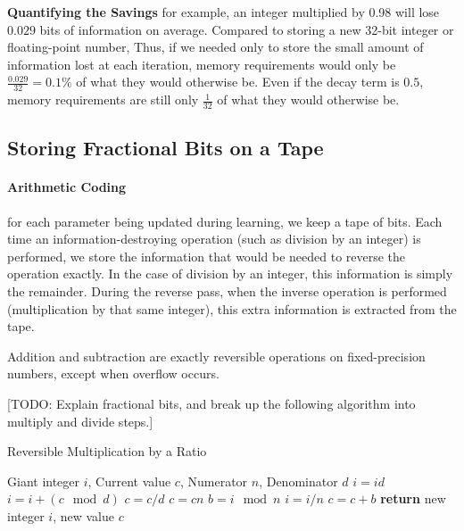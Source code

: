\documentclass{article}
\begin{document}
\textbf{Quantifying the Savings}
for example, an integer multiplied by 0.98 will lose $0.029$ bits of information on average.
Compared to storing a new 32-bit integer or floating-point number, 
Thus, if we needed only to store the small amount of information lost at each iteration, memory requirements would only be ${\frac{0.029}{32} = 0.1\%}$ of what they would otherwise be.
Even if the decay term is $0.5$, memory requirements are still only $\frac{1}{32}$ of what they would otherwise be.

\subsection{Storing Fractional Bits on a Tape}

\paragraph{Arithmetic Coding} 	\cite{steinruecken2014a}

for each parameter being updated during learning, we keep a tape of bits.
Each time an information-destroying operation (such as division by an integer) is performed, we store the information that would be needed to reverse the operation exactly.  In the case of division by an integer, this information is simply the remainder.
During the reverse pass, when the inverse operation is performed (multiplication by that same integer), this extra information is extracted from the tape.

Addition and subtraction are exactly reversible operations on fixed-precision numbers, except when overflow occurs.

[TODO: Explain fractional bits, and break up the following algorithm into multiply and divide steps.]

\begin{algorithm}
   \caption{Reversible Multiplication by a Ratio}
   \label{alg:reversible-mult}
\begin{algorithmic}[1]
    Giant integer $i$, Current value $c$, Numerator $n$, Denominator $d$
   \State $i = id$ 
   \State $i = i + (c \mod d)$ 
   \State $c = c / d$ 
   \State $c = cn$ 
   \State $b = i \mod n$ 
   \State $i = i / n$ 
   \State $c = c + b$ 
   \State \textbf{return} new integer $i$, new value $c$
\end{algorithmic}
\end{algorithm}
%
\end{document}
